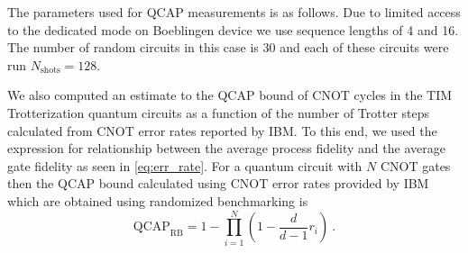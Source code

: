 
The parameters used for QCAP measurements is as follows. Due to limited access to the dedicated mode on Boeblingen device we use sequence lengths of 4 and 16. The number of random circuits in this case is 30 and each of these circuits were run $N_{\text{shots}}=128$. 


We also computed an estimate to the QCAP bound of CNOT cycles in the TIM Trotterization quantum circuits as a function of the number of Trotter steps calculated from CNOT error rates reported by IBM. To this end, we used the expression for relationship between the average process fidelity and the average gate fidelity as seen in \eqref{eq:err_rate}. For a quantum circuit with $N$ CNOT gates then the QCAP bound calculated using CNOT error rates provided by IBM which are obtained using randomized benchmarking is
\begin{equation}
    \text{QCAP}_{\text{RB}}=1-\prod_{i=1}^N\left(1-\frac{d}{d-1} r_i\right)~.\label{eq:QCAP_RB}
\end{equation}
